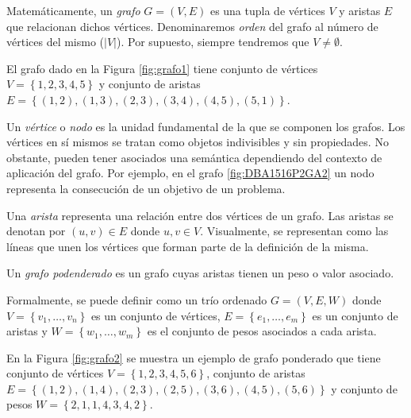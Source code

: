 \begin{definition}\label{def:grafo}
Matemáticamente, un \emph{grafo} $G = (V,E)$ es una tupla de vértices $V$ y aristas $E$ que relacionan dichos vértices. Denominaremos  \emph{orden} del grafo al número de vértices del mismo ($|V|$). Por supuesto, siempre tendremos que $V \neq \emptyset$.
\end{definition}

\begin{exampleth}
El grafo dado en la Figura \ref{fig:grafo1} tiene conjunto de vértices $V=\left\lbrace 1,2,3,4,5 \right\rbrace$ y conjunto de aristas $E=\left\lbrace (1,2),(1,3),(2,3),(3,4),(4,5),(5,1) \right\rbrace$.
\end{exampleth}

\begin{definition}
Un \emph{vértice} o \emph{nodo} es la unidad fundamental de la que se componen los grafos. Los vértices en sí mismos se tratan como objetos indivisibles y sin propiedades. No obstante, pueden tener asociados una semántica dependiendo del contexto de aplicación del grafo. Por ejemplo, en el grafo \ref{fig:DBA1516P2GA2} un nodo representa la consecución de un objetivo de un problema.
\end{definition}

\begin{definition}
Una \emph{arista} representa una relación entre dos vértices de un grafo. Las aristas se denotan por $(u,v) \in E$ donde $u,v\in V$. Visualmente, se representan como las líneas que unen los vértices que forman parte de la definición de la misma.
\end{definition}

\begin{definition}
Un \emph{grafo podenderado} es un grafo cuyas aristas tienen un peso o valor asociado.

Formalmente, se puede definir como un trío ordenado $G=(V,E,W)$ donde $V=\left\lbrace v_1, \dots, v_n \right\rbrace$ es un conjunto de vértices, $E = \left\lbrace e_1, \dots, e_m \right\rbrace$ es un conjunto de aristas y $W = \left\lbrace w_1,\dots,w_m\right\rbrace$ es el conjunto de pesos asociados a cada arista.
\end{definition}

\begin{exampleth}
En la Figura \ref{fig:grafo2} se muestra un ejemplo de grafo ponderado que tiene conjunto de vértices $V=\left\lbrace 1,2,3,4,5,6 \right\rbrace$, conjunto de aristas $E=\left\lbrace (1,2), (1,4), (2,3), (2,5), (3,6), (4,5), (5,6) \right\rbrace$ y conjunto de pesos $W=\left\lbrace 2, 1, 1, 4, 3, 4, 2 \right\rbrace$.
\end{exampleth}

